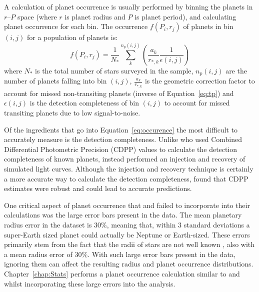 A calculation of planet occurrence is usually performed by binning the planets in $r$--$P$ space (where $r$ is planet radius and $P$ is planet period), and calculating planet occurrence for each bin. 
The occurrence $f(P_i, r_j)$ of planets in bin $(i,j)$ for a population of planets is:
\begin{equation}
f(P_i, r_j) = \frac{1}{N_*} \sum_k^{n_p(i,j)} \left(\frac{a_k}{r_{*,k}} \frac{1}{\epsilon(i,j)} \right)
\label{eq:occurence}
\end{equation}
where $N_*$ is the total number of stars surveyed in the sample, $n_p(i, j)$ are the number of planets falling into bin $(i, j)$, $\frac{a_k}{r_{*,k}}$ is the geometric correction factor to account for missed non-transiting planets (inverse of Equation~\ref{eq:tp}) and $\epsilon(i,j)$ is the detection completeness of bin $(i, j)$ to account for missed transiting planets due to low signal-to-noise.

Of the ingredients that go into Equation~\ref{eq:occurence} the most difficult to accurately measure is the detection completeness. 
Unlike \citet{Fressin2013} who used Combined Differential Photometric Precision (CDPP) values to calculate the detection completeness of known planets, \citet{Petigura2013} instead performed an injection and recovery of simulated light curves. 
Although the injection and recovery technique is certainly a more accurate way to calculate the detection completeness, \citet{Fressin2013} found that CDPP estimates were robust and could lead to accurate predictions. 

One critical aspect of planet occurrence that \citet{Fressin2013} and \citet{Petigura2013} failed to incorporate into their calculations was the large error bars present in the \kep data.
The mean planetary radius error in the \citep{Ramirez2014} \kep dataset is $30\%$, meaning that, within 3 standard deviations a super-Earth sized planet could actually be Neptune or Earth-sized. 
These errors primarily stem from the fact that the radii of \kep stars are not well known \citep{Brown2011}, also with a mean radius error of $30\%$.
With such large error bars present in the \kep data, ignoring them can affect the resulting radius and planet occurrence distributions.
Chapter~\ref{chap:Stats} performs a planet occurrence calculation similar to \citet{Fressin2013} and \citet{Petigura2013} whilst incorporating these large errors into the analysis. 


